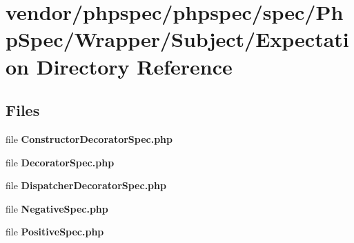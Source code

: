 \section{vendor/phpspec/phpspec/spec/\+Php\+Spec/\+Wrapper/\+Subject/\+Expectation Directory Reference}
\label{dir_4e0b7b7d534594fc2e51d18e5e073407}
\subsection*{Files}
\begin{DoxyCompactItemize}
\item 
file {\bf Constructor\+Decorator\+Spec.\+php}
\item 
file {\bf Decorator\+Spec.\+php}
\item 
file {\bf Dispatcher\+Decorator\+Spec.\+php}
\item 
file {\bf Negative\+Spec.\+php}
\item 
file {\bf Positive\+Spec.\+php}
\end{DoxyCompactItemize}
